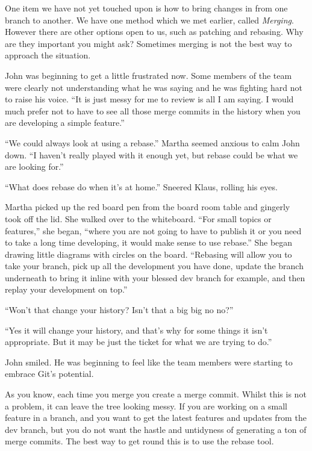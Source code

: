 One item we have not yet touched upon is how to bring changes in from one branch to another.  We have one method which we met earlier, called \emph{Merging}.  However there are other options open to us, such as patching and rebasing.  Why are they important you might ask?  Sometimes merging is not the best way to approach the situation.  

\begin{trenches}
John was beginning to get a little frustrated now.  Some members of the team were clearly not understanding what he was saying and he was fighting hard not to raise his voice.  ``It is just messy for me to review is all I am saying.  I would much prefer not to have to see all those merge commits in the history when you are developing a simple feature.''

``We could always look at using a rebase.''  Martha seemed anxious to calm John down.  ``I haven't really played with it enough yet, but rebase could be what we are looking for.''

``What does rebase do when it's at home.''  Sneered Klaus, rolling his eyes.

Martha picked up the red board pen from the board room table and gingerly took off the lid.  She walked over to the whiteboard.  ``For small topics or features,'' she began, ``where you are not going to have to publish it or you need to take a long time developing, it would make sense to use rebase.''  She began drawing little diagrams with circles on the board.  ``Rebasing will allow you to take your branch, pick up all the development you have done, update the branch underneath to bring it inline with your blessed dev branch for example, and then replay your development on top.''

``Won't that change your history?  Isn't that a big big no no?''

``Yes it will change your history, and that's why for some things it isn't appropriate.  But it may be just the ticket for what we are trying to do.''

John smiled.  He was beginning to feel like the team members were starting to embrace Git's potential. 
\end{trenches}

As you know, each time you merge you create a merge commit.  Whilst this is not a problem, it can leave the tree looking messy.  If you are working on a small feature in a branch, and you want to get the latest features and updates from the dev branch, but you do not want the hastle and untidyness of generating a ton of merge commits.  The best way to get round this is to use the rebase tool.

